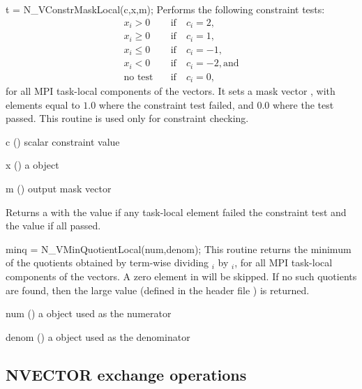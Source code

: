 {
  t = N\_VConstrMaskLocal(c,x,m);
}
{
  Performs the following constraint tests:
  {\begin{align*}
  x_i > 0        & \quad \text{if} \quad c_i=2, \\
  x_i \ge 0      & \quad \text{if} \quad c_i=1, \\
  x_i \le 0      & \quad \text{if} \quad c_i=-1, \\
  x_i < 0        & \quad \text{if} \quad c_i=-2, \text{and} \\
  \text{no test} & \quad \text{if} \quad c_i=0,
  \end{align*}}%
  for all MPI task-local components of the vectors.
  It sets a mask vector , with elements equal to $1.0$ where
  the constraint test failed, and $0.0$ where the test passed. This
  routine is used only for constraint checking.
}
{
  \begin{args}[c]
  \item[c] () scalar constraint value
  \item[x] () a {\nvector} object
  \item[m] () output mask vector
  \end{args}
}
{
  Returns a  with the value  if any
  task-local element failed the constraint test and the value
   if all passed.
}
{}

{
  minq = N\_VMinQuotientLocal(num,denom);
}
{
  This routine returns the minimum of the quotients obtained
  by term-wise dividing $_i$ by $_i$, for all MPI
  task-local components of the vectors.  A zero element in 
  will be skipped. If no such quotients are found, then the large value
   (defined in the header file )
  is returned.
}
{
  \begin{args}[denom]
  \item[num] () a {\nvector} object used as the numerator
  \item[denom] () a {\nvector} object used as the denominator
  \end{args}
}
{
}
{}


\subsection{NVECTOR exchange operations}\label{ss:nvecexchangeops}

